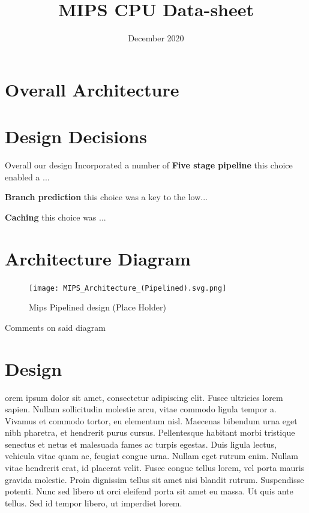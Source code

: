 \documentclass[10pt]{datasheet}
\title{MIPS CPU Data-sheet}
\date{December 2020}
\begin{document}
\maketitle

\section{Overall Architecture}
\smallbreak

\section{Design Decisions}
Overall our design Incorporated a number of 
\textbf{Five stage pipeline} this choice enabled a ...

\textbf{Branch prediction} this choice was a key to the low...

\textbf{Caching} this choice was ...


\smallbreak


\vfill\break

\section{Architecture Diagram}
\smallbreak
\begin{figure}[h]
    \texttt{[image: MIPS\_Architecture\_(Pipelined).svg.png]}
    \captionsetup{justification=centering}
    \caption{Mips Pipelined design (Place Holder)}
\end{figure}

Comments on said diagram


\newpage

\onecolumn

\section{Design}

orem ipsum dolor sit amet, consectetur adipiscing elit. Fusce ultricies lorem sapien. Nullam sollicitudin molestie arcu, vitae commodo ligula tempor a. Vivamus et commodo tortor, eu elementum nisl. Maecenas bibendum urna eget nibh pharetra, et hendrerit purus cursus. Pellentesque habitant morbi tristique senectus et netus et malesuada fames ac turpis egestas. Duis ligula lectus, vehicula vitae quam ac, feugiat congue urna. Nullam eget rutrum enim. Nullam vitae hendrerit erat, id placerat velit. Fusce congue tellus lorem, vel porta mauris gravida molestie. Proin dignissim tellus sit amet nisi blandit rutrum. Suspendisse potenti. Nunc sed libero ut orci eleifend porta sit amet eu massa. Ut quis ante tellus. Sed id tempor libero, ut imperdiet lorem.
\end{document}
